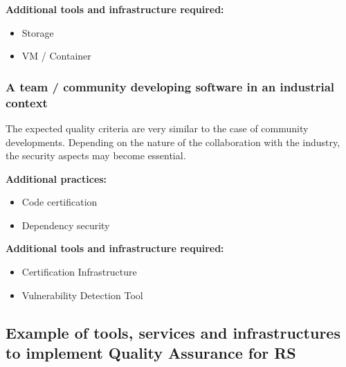 {\bf Additional tools and infrastructure required:}
\begin{itemize}
\item Storage
\item VM / Container
\end{itemize}

\subsubsection{A team / community developing software in an industrial context}

The expected quality criteria are very similar to the case of
community developments. Depending on the nature of the collaboration
with the industry, the security aspects may become essential. 

{\bf Additional practices:}
\begin{itemize}
\item Code certification
\item Dependency security
\end{itemize}

{\bf Additional tools and infrastructure required:}
\begin{itemize}
\item Certification Infrastructure
\item Vulnerability Detection Tool
\end{itemize}

\subsection{Example of tools, services and infrastructures to implement Quality Assurance for RS}

